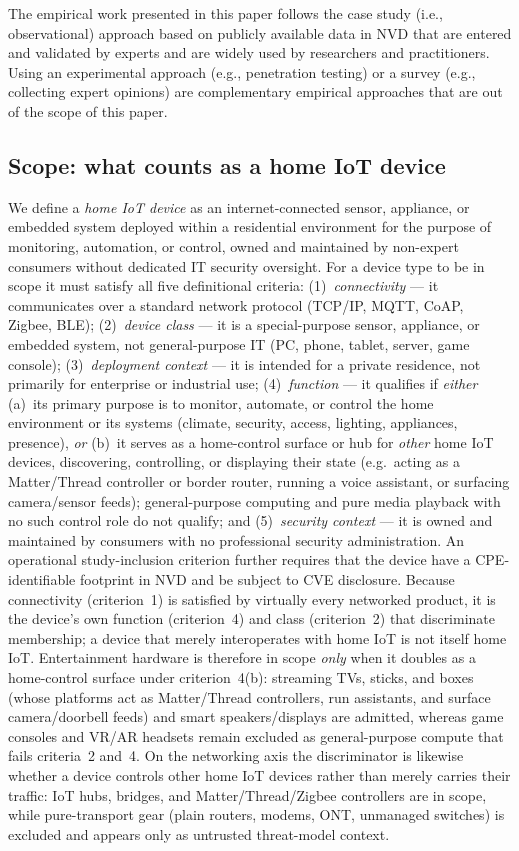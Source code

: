 \documentclass[conference]{IEEEtran}
\begin{document}
The empirical work presented in this paper follows the case study (i.e.,
observational) approach based on publicly available data in NVD that are entered
and validated by experts and are widely used by researchers and practitioners.
Using an experimental approach (e.g., penetration testing) or a survey (e.g.,
collecting expert opinions) are complementary empirical approaches that are out
of the scope of this paper.

\subsection{Scope: what counts as a home IoT device}
\label{sec:method-scope}

We define a \emph{home IoT device} as an internet-connected sensor, appliance,
or embedded system deployed within a residential environment for the purpose of
monitoring, automation, or control, owned and maintained by non-expert consumers
without dedicated IT security oversight. For a device type to be in scope it must
satisfy all five definitional criteria: (1)~\emph{connectivity} --- it
communicates over a standard network protocol (TCP/IP, MQTT, CoAP, Zigbee, BLE);
(2)~\emph{device class} --- it is a special-purpose sensor, appliance, or
embedded system, not general-purpose IT (PC, phone, tablet, server, game
console); (3)~\emph{deployment context} --- it is intended for a private
residence, not primarily for enterprise or industrial use; (4)~\emph{function}
--- it qualifies if \emph{either} (a)~its primary purpose is to monitor, automate,
or control the home environment or its systems (climate, security, access,
lighting, appliances, presence), \emph{or} (b)~it serves as a home-control surface
or hub for \emph{other} home IoT devices, discovering, controlling, or displaying
their state (e.g.\ acting as a Matter/Thread controller or border router, running a
voice assistant, or surfacing camera/sensor feeds); general-purpose computing and
pure media playback with no such control role do not qualify; and
(5)~\emph{security context} --- it is owned and
maintained by consumers with no professional security administration. An
operational study-inclusion criterion further requires that the device have a
CPE-identifiable footprint in NVD and be subject to CVE disclosure. Because
connectivity (criterion~1) is satisfied by virtually every networked product, it
is the device's own function (criterion~4) and class (criterion~2) that
discriminate membership; a device that merely interoperates with home IoT is not
itself home IoT. Entertainment hardware is therefore in scope \emph{only} when it
doubles as a home-control surface under criterion~4(b): streaming TVs, sticks, and
boxes (whose platforms act as Matter/Thread controllers, run assistants, and
surface camera/doorbell feeds) and smart speakers/displays are admitted, whereas
game consoles and VR/AR headsets remain excluded as general-purpose compute that
fails criteria~2 and~4. On the networking axis the discriminator is likewise
whether a device controls other home IoT devices rather than merely carries their
traffic: IoT hubs, bridges, and Matter/Thread/Zigbee controllers are in scope,
while pure-transport gear (plain routers, modems, ONT, unmanaged switches) is
excluded and appears only as untrusted threat-model context.
\end{document}
